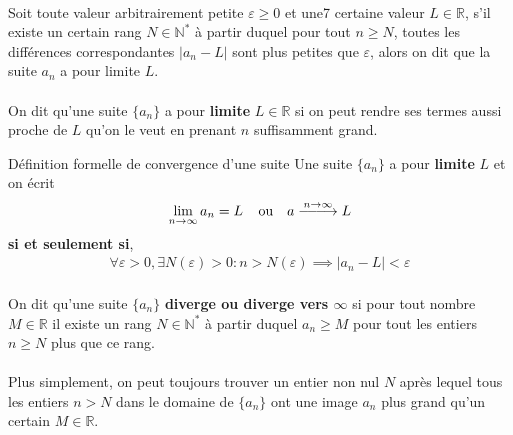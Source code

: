 \documentclass[16pt]{report}
\DeclareRobustCommand{\looongrightarrow}{%
  \DOTSB\relbar\joinrel\relbar\joinrel\relbar\joinrel\rightarrow
}
\begin{document}
\begin{multicols*}{2}
    \paragraph{}
    Soit toute valeur arbitrairement petite $\varepsilon \geq 0$ et une7 
    certaine valeur $L \in \mathbb{R}$, s'il 
    existe un certain rang $N \in \mathbb{N}^{*}$ à partir duquel 
    pour tout $n \geq N$, toutes les différences correspondantes 
    $|a_n - L|$ sont plus petites que $\varepsilon$, alors on dit que 
    la suite $a_n$ a pour limite $L$. 


    \paragraph{}
    On dit qu'une suite $\{a_n\}$ a pour 
    \textbf{limite} $L \in \mathbb{R}$ si on peut rendre ses termes 
    aussi proche de $L$ qu'on le veut en prenant $n$ suffisamment grand. 



    \begin{Definitionx}{Définition formelle de convergence d'une suite}{}
      Une suite $\{ a_n \}$ a pour \textbf{limite} $L$ et on écrit 
      \begin{align*}
        \lim\limits_{n  \to  \infty}{a_n} = 
        L \; \; \; \;\text{ou} \quad 
        a \stackrel{n \to \infty}{\looongrightarrow} L 
      \end{align*}
      \textbf{si et seulement si}, 
      \begin{align}
        \forall\varepsilon > 0, \exists N\left( \varepsilon \right) > 0 : 
        n > N\left( \varepsilon \right) \implies 
        |a_n -L| < \varepsilon
      \end{align}
    \end{Definitionx}


    \paragraph{}
    On dit qu'une suite $\{a_n\}$ 
    \textbf{diverge ou diverge vers $\infty$} 
    si pour tout nombre $M \in \mathbb{R}$ il existe un rang
    $N \in \mathbb{N}^{*}$ à partir duquel $a_n \geq M$ pour tout 
    les entiers $n \geq N$ plus que ce rang. 


    \paragraph{}
    Plus simplement, on peut toujours trouver un entier non nul 
    $N$ après lequel tous les entiers $n > N$ dans le domaine
    de $\{ a_n \}$ ont une image $a_n$ plus grand qu'un certain 
    $M \in \mathbb{R}$. 



\end{multicols*}
\end{document}
